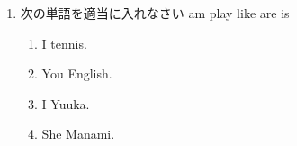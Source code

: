 \documentclass[fleqn]{jsarticle}
\begin{document}
\begin{enumerate}
\begin{table}[htb]
\begin{tabular}{lcrrrr}
      \end{tabular}
    \end{table}
  \item 次の単語を適当に入れなさい
    am play like are is
    \begin{enumerate}
      \item I \underline{\hspace{4zw}} tennis.
      \item You \underline{\hspace{4zw}} English.
      \item I \underline{\hspace{4zw}} Yuuka.
      \item She \underline{\hspace{4zw}} Manami.
    \end{enumerate}


\end{enumerate}
\end{document}
